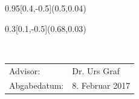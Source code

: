 
\begin{titlepage}
	\setlength{\TPHorizModule}{\paperwidth}
	\setlength{\TPVertModule}{\paperheight}
	
	
	
	\begin{textblock}{0.95}[0.4,-0.5](0.5,0.04)
	\end{textblock}
	\begin{textblock}{0.3}[0.1,-0.5](0.68,0.03)
	\end{textblock}
    \vspace*{6cm}
    \begin{center}
    	\Huge{\color{HeadBlue}{Neuer Sequencer für EEROS\\}}
		\vspace*{5cm}
		\normalsize
      	{}\\
		\vspace*{2cm}      	


    \vspace*{3cm}
    \color{HeadBlue}
    \begin{tabular}{p{4cm}l}
      Advisor: & Dr. Urs Graf \\
      Abgabedatum: & 8. Februar 2017
    \end{tabular}\\
    \end{center}
  \end{titlepage}



